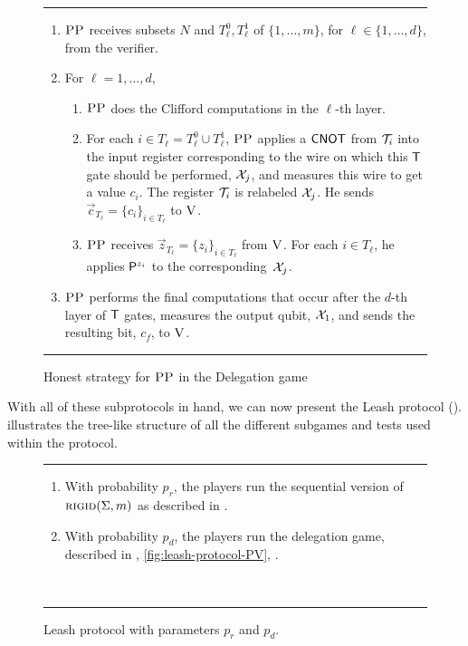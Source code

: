 \documentclass{toc}
\newcommand{\rigid}{\textsc{rigid}}
\newcommand{\ver}{\textsc{V}}
\newcommand{\pp}{\textsc{PP}}
\begin{document}
  \begin{figure}[htbp]
\rule[1ex]{\textwidth}{0.5pt}
\vspace{-1.8em}
\begin{enumerate}
\item $\pp$ receives subsets $N$ and $T_\ell^0,T_\ell^1$ of $\{1,\ldots,m\}$, for $\ell\in\{1,\ldots,d\}$, from the verifier. 
\item For $\ell=1,\dots,d$, 
\begin{enumerate}
\item $\pp$ does the Clifford computations in the $\ell$-th layer.
 \item For each $i\in T_\ell = T_\ell^0\cup T_\ell^1$, $\pp$ applies a $\sf CNOT$ from ${\cal T}_i$ into the input register corresponding to the wire on which this $\sf T$ gate should be performed, ${\cal X}_{j}$, and measures this wire to get a value $c_i$. The register ${\cal T}_i$ is relabeled ${\cal X}_{j}$. He sends $\vec{c}_{T_\ell} = \{c_i\}_{i\in T_{\ell}}$ to $\ver$.
\item $\pp$ receives $\vec{z}_{T_{\ell}}=\{z_i\}_{i\in T_\ell}$ from $\ver$. For each $i\in T_\ell$, he applies ${\sf P}^{z_i}$ to the corresponding~${\cal X}_{j}$. 
\end{enumerate} 
\item $\pp$ performs the final computations that occur after the $d$-th layer of $\sf T$ gates, measures the output qubit, ${\cal X}_1$, and sends the resulting bit, $c_f$, to $\ver$. 
\end{enumerate}
\rule[2ex]{\textwidth}{0.5pt}\vspace{-.5cm}
\caption{Honest strategy for $\pp$  in the Delegation game}\label{fig:leash-protocol-PP}
\end{figure}




With all of these subprotocols in hand, we can now present the Leash protocol ().  illustrates the tree-like structure of all the different subgames and tests used within the protocol.

\begin{figure}[H]
\rule[1ex]{\textwidth}{0.5pt}
\vspace{-25pt}
\justify 
\begin{enumerate}
\item With probability $p_r$, the players run the sequential version of $\rigid(\Sigma,m)$ as described in .
\item With probability $p_d$, the players run the delegation game, described in , \ref{fig:leash-protocol-PV}, .
\end{enumerate}
~\\
\rule[2ex]{\textwidth}{0.5pt}\vspace{-.5cm}
\caption{Leash protocol with parameters $p_r$ and $p_d$.}
\label{fig:leash-description}
\end{figure} 
\end{document}
